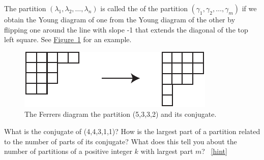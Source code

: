 \documentclass{book}
\begin{document}
\setcounter{project}{304}
\addtocounter{project}{-1}
\begin{activity}[]\label{activity-297}
\hypertarget{p-1543}{}%
The partition \((\lambda_1,\lambda_2,\ldots, \lambda_n)\) is called the  of the partition \((\gamma_1,\gamma_2,\ldots, \gamma_m)\) if we obtain the Young diagram of one from the Young diagram of the other by flipping one around the line with slope -1 that extends the diagonal of the top left square. See \hyperref[conjugateYoung]{Figure~\ref{conjugateYoung}} for an example.%
\begin{figure}
\centering
\includegraphics[width=0.5\linewidth]{images/conjugateYoung}
\caption{The Ferrers diagram the partition (5,3,3,2) and its conjugate.\label{conjugateYoung}}
\end{figure}
\hypertarget{p-1544}{}%
What is the conjugate of (4,4,3,1,1)? How is the largest part of a partition related to the number of parts of its conjugate? What does this tell you about the number of partitions of a positive integer \(k\) with largest part \(m\)?%
~\hfill{\tiny\hyperlink{a-304}{[hint]}\hypertarget{q-304}{}}\end{activity}
\end{document}
